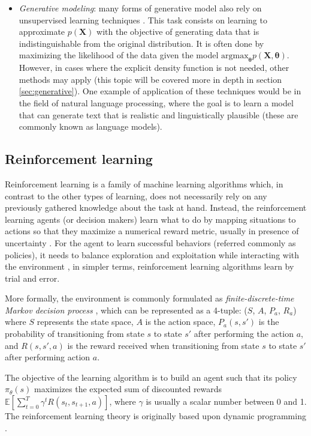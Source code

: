 \begin{itemize}
	\item \textit{Generative modeling}: many forms of generative model also rely on unsupervised learning techniques \autocite{bishop2006}. This task consists on learning to approximate $p(\mathbf{X})$ with the objective of generating data that is indistinguishable from the original distribution. It is often done by maximizing the likelihood of the data given the model $\mathrm{argmax}_\mathbf{\theta} p(\mathbf{\mathbf{X},\mathbf{\theta}})$. However, in cases where the explicit density function is not needed, other methods may apply (this topic will be covered more in depth in section \ref{sec:generative}).  One example of application of these techniques would be in the field of natural language processing, where the goal is to learn a model that can generate text \autocite{uday2019} that is realistic and linguistically plausible (these are commonly known as language models).
\end{itemize}


\subsection{Reinforcement learning}
Reinforcement learning is a family of machine learning algorithms which, in contrast to the other types of learning, does not necessarily rely on any previously gathered knowledge about the task at hand. Instead, the reinforcement learning agents (or decision makers) learn what to do by mapping situations to actions \autocite{sutton2018} so that they maximize a numerical reward metric, usually in presence of uncertainty \autocite{haykin1998}. For the agent to learn successful behaviors (referred commonly as policies), it needs to balance exploration and exploitation while interacting with the environment \autocite{sutton2018}, in simpler terms, reinforcement learning algorithms learn by trial and error.

More formally, the environment is commonly formulated as \textit{finite-discrete-time Markov decision process} \autocite{haykin1998}, which can be represented as a 4-tuple: ($S$, $A$, $P_a$, $R_a$) where $S$ represents the state space, $A$ is the action space, $P_a(s, s')$ is the probability of transitioning from state $s$ to state $s'$ after performing the action $a$, and $R(s, s', a)$ is the reward received when transitioning from state $s$ to state $s'$ after performing action $a$. 

The objective of the learning algorithm is to build an agent such that its policy $\pi_\theta(s)$ maximizes the expected sum of discounted rewards $\mathbb{E} \left[ \sum_{t=0}^{T} \gamma^t R(s_t, s_{t+1}, a) \right]$, where $\gamma$ is usually a scalar number between 0 and 1. The reinforcement learning theory is originally based upon dynamic programming \autocite{szepesvari2010}.

